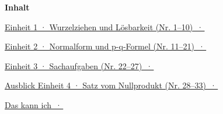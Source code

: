 \documentclass[11pt]{article}
\newcommand{\vzeile}[3]{\noindent\hyperlink{#1}{#2 \,·\, #3}\par\medskip}
\providecommand{\Seins}{}\providecommand{\Szwei}{}\providecommand{\Sdrei}{}\providecommand{\Svier}{}\providecommand{\Sabhaken}{}
\begin{document}
\weit
{\large\bfseries Inhalt}\par\bigskip
\vzeile{e1}{Einheit 1 · Wurzelziehen und Lösbarkeit (Nr. 1–10)}{\Seins}
\vzeile{e2}{Einheit 2 · Normalform und p-q-Formel (Nr. 11–21)}{\Szwei}
\vzeile{e3}{Einheit 3 · Sachaufgaben (Nr. 22–27)}{\Sdrei}
\vzeile{e4}{Ausblick Einheit 4 · Satz vom Nullprodukt (Nr. 28–33)}{\Svier}
\vzeile{abhaken}{Das kann ich}{\Sabhaken}
\clearpage

\clearpage

\clearpage

\clearpage


\end{document}
